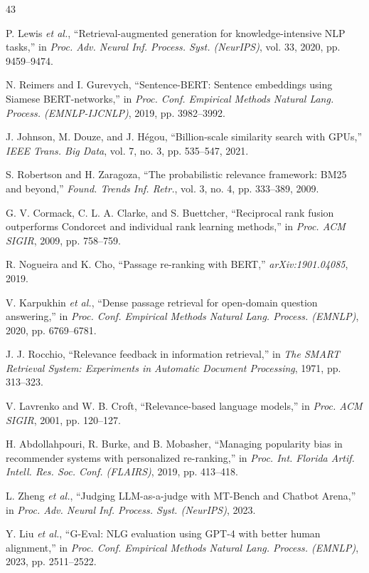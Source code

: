 \begin{thebibliography}{43}

 P. Lewis \emph{et al.}, ``Retrieval-augmented generation for knowledge-intensive NLP tasks,'' in \emph{Proc. Adv. Neural Inf. Process. Syst. (NeurIPS)}, vol. 33, 2020, pp. 9459--9474.

 N. Reimers and I. Gurevych, ``Sentence-BERT: Sentence embeddings using Siamese BERT-networks,'' in \emph{Proc. Conf. Empirical Methods Natural Lang. Process. (EMNLP-IJCNLP)}, 2019, pp. 3982--3992.

 J. Johnson, M. Douze, and J. H\'egou, ``Billion-scale similarity search with GPUs,'' \emph{IEEE Trans. Big Data}, vol. 7, no. 3, pp. 535--547, 2021.

 S. Robertson and H. Zaragoza, ``The probabilistic relevance framework: BM25 and beyond,'' \emph{Found. Trends Inf. Retr.}, vol. 3, no. 4, pp. 333--389, 2009.

 G. V. Cormack, C. L. A. Clarke, and S. Buettcher, ``Reciprocal rank fusion outperforms Condorcet and individual rank learning methods,'' in \emph{Proc. ACM SIGIR}, 2009, pp. 758--759.

 R. Nogueira and K. Cho, ``Passage re-ranking with BERT,'' \emph{arXiv:1901.04085}, 2019.

 V. Karpukhin \emph{et al.}, ``Dense passage retrieval for open-domain question answering,'' in \emph{Proc. Conf. Empirical Methods Natural Lang. Process. (EMNLP)}, 2020, pp. 6769--6781.

 J. J. Rocchio, ``Relevance feedback in information retrieval,'' in \emph{The SMART Retrieval System: Experiments in Automatic Document Processing}, 1971, pp. 313--323.

 V. Lavrenko and W. B. Croft, ``Relevance-based language models,'' in \emph{Proc. ACM SIGIR}, 2001, pp. 120--127.

 H. Abdollahpouri, R. Burke, and B. Mobasher, ``Managing popularity bias in recommender systems with personalized re-ranking,'' in \emph{Proc. Int. Florida Artif. Intell. Res. Soc. Conf. (FLAIRS)}, 2019, pp. 413--418.

 L. Zheng \emph{et al.}, ``Judging LLM-as-a-judge with MT-Bench and Chatbot Arena,'' in \emph{Proc. Adv. Neural Inf. Process. Syst. (NeurIPS)}, 2023.

 Y. Liu \emph{et al.}, ``G-Eval: NLG evaluation using GPT-4 with better human alignment,'' in \emph{Proc. Conf. Empirical Methods Natural Lang. Process. (EMNLP)}, 2023, pp. 2511--2522.


\end{thebibliography}
